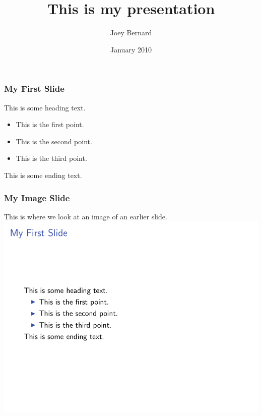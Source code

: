 \documentclass{beamer}
\title{This is my presentation}
\author{Joey Bernard}
\date{January 2010}
\begin{document}
\maketitle

\begin{frame}
   \frametitle{My First Slide}
   This is some heading text.
   \begin{itemize}
      \item This is the first point.
      \item This is the second point.
      \item This is the third point.
   \end{itemize}
   This is some ending text.
\end{frame}
\begin{frame}
   \frametitle{My Image Slide}
   This is where we look at an image of an earlier slide.
   \includegraphics[angle=180,scale=0.5]{slide1.png}
\end{frame}
\end{document}
